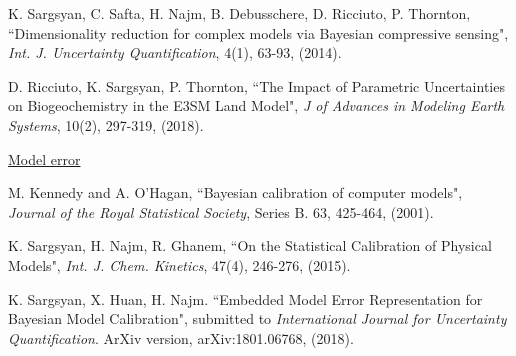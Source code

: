 \begin{frame}[t]
\begin{tiny}
{ \medskip
K. Sargsyan, C. Safta, H. Najm, B. Debusschere, D. Ricciuto, P. Thornton, ``Dimensionality reduction for complex models via Bayesian compressive sensing", \textit{Int. J. Uncertainty Quantification}, 4(1), 63-93, (2014).

\medskip
D. Ricciuto, K. Sargsyan, P. Thornton, ``The Impact of Parametric Uncertainties on Biogeochemistry in the E3SM Land Model", \textit{J of Advances in Modeling Earth Systems}, 10(2), 297-319, (2018).

\medskip
 \scriptsize{\underline{Model error}}\tiny


\medskip
M. Kennedy and A. O'Hagan, ``Bayesian calibration of computer models", \textit{Journal of the Royal Statistical Society}, Series B. 63, 425-464, (2001).

\medskip
K. Sargsyan, H. Najm, R. Ghanem, ``On the Statistical Calibration of Physical Models", \textit{Int. J. Chem. Kinetics}, 47(4), 246-276, (2015).

\medskip
K. Sargsyan, X. Huan, H. Najm. ``Embedded Model Error Representation for Bayesian Model Calibration", submitted to \emph{International Journal for Uncertainty Quantification}. ArXiv version, arXiv:1801.06768, (2018).

}

\end{tiny}
\end{frame}
